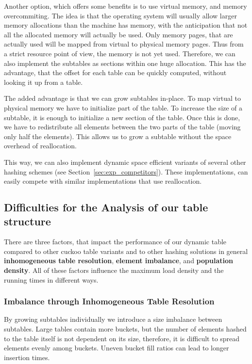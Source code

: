 \documentclass[a4paper,UKenglish]{lipics-v2016}
\begin{document}
Another option, which offers some benefits is to use virtual memory,
and memory overcommiting.  The idea is that the operating system will
usually allow larger memory allocations than the machine has memory,
with the anticipation that not all the allocated memory will actually
be used.  Only memory pages, that are actually used will be mapped
from virtual to physical memory pages.  Thus from a strict resource
point of view, the memory is not yet used.  Therefore, we can also
implement the subtables as sections within one huge allocation.  This
has the advantage, that the offset for each table can be quickly
computed, without looking it up from a table.

The added advantage is that we can grow subtables in-place. To map
virtual to physical memory we have to initialize part of the table. To
increase the size of a subtable, it is enough to initialize a new
section of the table.  Once this is done, we have to redistribute all
elements between the two parts of the table (moving only half the
elements).  This allows us to grow a subtable without the space
overhead of reallocation.

This way, we can also implement dynamic space efficient variants of
several other hashing schemes (see Section~\ref{sec:exp_competitors}).
These implementations, can easily compete with similar implementations
that use reallocation.

\subsection{Difficulties for the Analysis of our table structure}
There are three factors, that impact the performance of our dynamic
table compared to other cuckoo table variants and to other hashing solutions in
general \textbf{inhomogeneous table resolution}, \textbf{element imbalance}, and
\textbf{population density}. All of these factors influence the maximum load
density and the running times in different ways.

\subsubsection*{Imbalance through Inhomogeneous Table Resolution}
\label{sec:inhom_res}
By growing subtables individually we introduce a size imbalance
between subtables.  Large tables contain more buckets, but the number
of elements hashed to the table itself is not dependent on its size,
therefore, it is difficult to spread elements evenly among buckets.
Uneven bucket fill ratios can lead to longer insertion times.
\end{document}
